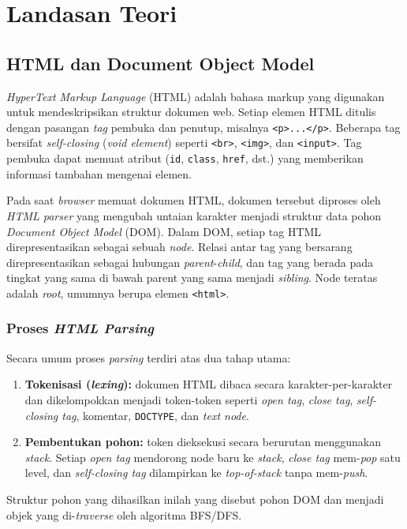 \chapter{Landasan Teori}

\section{HTML dan Document Object Model}

\textit{HyperText Markup Language} (HTML) adalah bahasa markup yang digunakan untuk mendeskripsikan struktur dokumen web. Setiap elemen HTML ditulis dengan pasangan \textit{tag} pembuka dan penutup, misalnya \texttt{<p>...</p>}. Beberapa tag bersifat \textit{self-closing} (\textit{void element}) seperti \texttt{<br>}, \texttt{<img>}, dan \texttt{<input>}. Tag pembuka dapat memuat atribut (\texttt{id}, \texttt{class}, \texttt{href}, dst.) yang memberikan informasi tambahan mengenai elemen.

Pada saat \textit{browser} memuat dokumen HTML, dokumen tersebut diproses oleh \textit{HTML parser} yang mengubah untaian karakter menjadi struktur data pohon \textit{Document Object Model} (DOM). Dalam DOM, setiap tag HTML direpresentasikan sebagai sebuah \textit{node}. Relasi antar tag yang bersarang direpresentasikan sebagai hubungan \textit{parent}-\textit{child}, dan tag yang berada pada tingkat yang sama di bawah parent yang sama menjadi \textit{sibling}. Node teratas adalah \textit{root}, umumnya berupa elemen \texttt{<html>}.

\subsection{Proses \textit{HTML Parsing}}
Secara umum proses \textit{parsing} terdiri atas dua tahap utama:
\begin{enumerate}
    \item \textbf{Tokenisasi (\textit{lexing}):} dokumen HTML dibaca secara karakter-per-karakter dan dikelompokkan menjadi token-token seperti \textit{open tag}, \textit{close tag}, \textit{self-closing tag}, komentar, \texttt{DOCTYPE}, dan \textit{text node}.
    \item \textbf{Pembentukan pohon:} token dieksekusi secara berurutan menggunakan \textit{stack}. Setiap \textit{open tag} mendorong node baru ke \textit{stack}, \textit{close tag} mem-\textit{pop} satu level, dan \textit{self-closing tag} dilampirkan ke \textit{top-of-stack} tanpa mem-\textit{push}.
\end{enumerate}
Struktur pohon yang dihasilkan inilah yang disebut pohon DOM dan menjadi objek yang di-\textit{traverse} oleh algoritma BFS/DFS.

